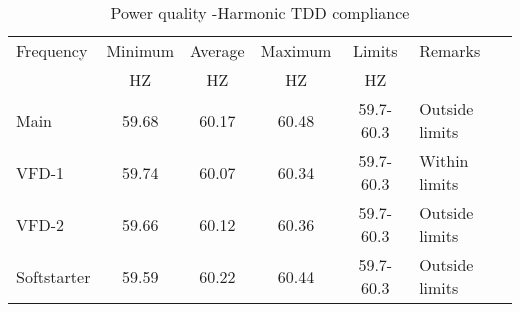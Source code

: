 \begin{table}[!htb]
	\caption{Power quality -Harmonic TDD compliance}
	\label{tbl_ch04_elecaudit_powerquality_frequency}
	{\scriptsize
\begin{tabular}{l|l|l|l|l|l}
\hline
Frequency & \multicolumn{1}{c|}{Minimum} & \multicolumn{1}{c|}{Average} & \multicolumn{1}{c|}{Maximum} & \multicolumn{1}{c|}{Limits} & Remarks \\ 
& \multicolumn{1}{c|}{HZ} & \multicolumn{1}{c|}{HZ} & \multicolumn{1}{c|}{HZ} & \multicolumn{1}{c|}{HZ} &  \\ 
\hline
Main  & \multicolumn{1}{c|}{59.68} & \multicolumn{1}{c|}{60.17} & \multicolumn{1}{c|}{60.48} & \multicolumn{1}{c|}{59.7-60.3} & Outside limits \\ 
VFD-1 & \multicolumn{1}{c|}{59.74} & \multicolumn{1}{c|}{60.07} & \multicolumn{1}{c|}{60.34} & \multicolumn{1}{c|}{59.7-60.3} & Within limits \\ 
VFD-2 & \multicolumn{1}{c|}{59.66} & \multicolumn{1}{c|}{60.12} & \multicolumn{1}{c|}{60.36} & \multicolumn{1}{c|}{59.7-60.3} & Outside limits \\ 
Softstarter & \multicolumn{1}{c|}{59.59} & \multicolumn{1}{c|}{60.22} & \multicolumn{1}{c|}{60.44} & \multicolumn{1}{c|}{59.7-60.3} & Outside limits \\ 
\hline
\end{tabular}
		
	}%
\end{table}